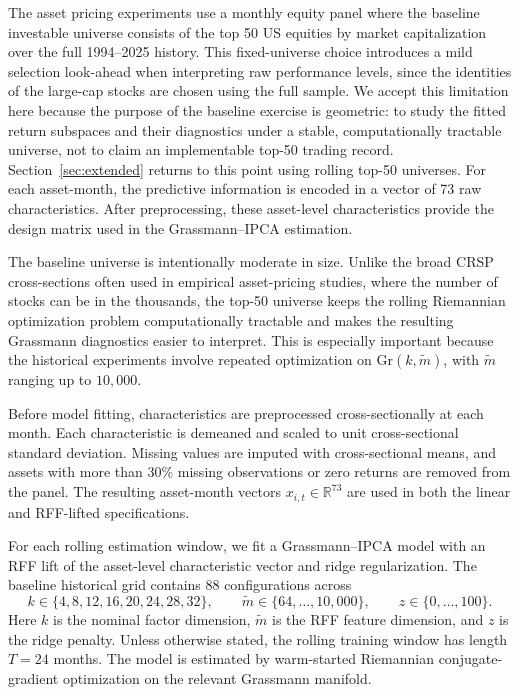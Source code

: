 \documentclass[11pt,letterpaper]{article}
\newcommand{\gr}{\mathrm{Gr}}
\newcommand{\bR}{\mathbb{R}}
\begin{document}
The asset pricing experiments use a monthly equity panel where the baseline investable universe consists of the top
50 US equities by market capitalization over the full 1994--2025 history. This fixed-universe choice introduces a mild selection look-ahead when interpreting raw performance levels, since the identities of the large-cap stocks are chosen using the full sample. We accept this limitation here because the purpose of the baseline exercise is geometric: to study the fitted return subspaces and their diagnostics under a stable, computationally tractable universe, not to claim an implementable top-50 trading record. Section~\ref{sec:extended} returns to this point using rolling top-50 universes. For each
asset-month, the predictive information is encoded in a vector of 73 raw
characteristics. After preprocessing, these asset-level characteristics provide
the design matrix used in the Grassmann--IPCA estimation.

The baseline universe is intentionally moderate in size. Unlike the broad CRSP
cross-sections often used in empirical asset-pricing studies, where the number
of stocks can be in the thousands, the top-50 universe keeps the rolling
Riemannian optimization problem computationally tractable and makes the
resulting Grassmann diagnostics easier to interpret. This is especially
important because the historical experiments involve repeated optimization on
$\gr(k,\tilde m)$, with $\tilde m$ ranging up to $10{,}000$.

Before model fitting, characteristics are preprocessed cross-sectionally at
each month. Each characteristic is demeaned and scaled to unit cross-sectional
standard deviation. Missing values are imputed with cross-sectional means, and
assets with more than $30\%$ missing observations or zero returns are removed
from the panel. The resulting asset-month vectors
$x_{i,t}\in\bR^{73}$ are used in both the linear and RFF-lifted
specifications.

For each rolling estimation window, we fit a Grassmann--IPCA model with an RFF
lift of the asset-level characteristic vector and ridge regularization. The
baseline historical grid contains 88 configurations across
\begin{equation*}
	k \in \{4,8,12,16,20,24,28,32\},
	\qquad
	\tilde m \in \{64,\ldots,10{,}000\},
	\qquad
	z \in \{0,\ldots,100\}.
\end{equation*}
Here $k$ is the nominal factor dimension, $\tilde m$ is the RFF feature dimension,
and $z$ is the ridge penalty. Unless otherwise stated, the rolling training
window has length $T=24$ months. The model is estimated by warm-started
Riemannian conjugate-gradient optimization on the relevant Grassmann manifold.
\end{document}
